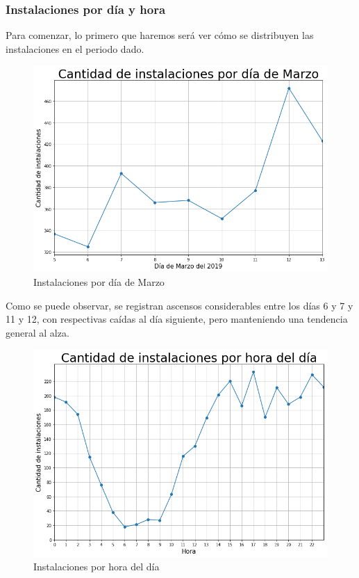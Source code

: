 \documentclass[a4paper, 12pt]{article}
\begin{document}
	\subsubsection{Instalaciones por día y hora}
		Para comenzar, lo primero que haremos será ver cómo se distribuyen las instalaciones en el periodo dado.
		\FloatBarrier
		\begin{figure}[h]
			\centering
			\includegraphics[width=\textwidth]{images/installs/installspordia.png}
			\caption{Instalaciones por día de Marzo}
		\end{figure}
		\FloatBarrier

		Como se puede observar, se registran ascensos considerables entre los días 6 y 7 y 11 y 12, con respectivas caídas al día siguiente, pero manteniendo una tendencia general al alza.

		\FloatBarrier
		\begin{figure}[h]
			\centering
			\includegraphics[width=\textwidth]{images/installs/installsxhora.png}
			\caption{Instalaciones por hora del día}
		\end{figure}
		\FloatBarrier
\end{document}
